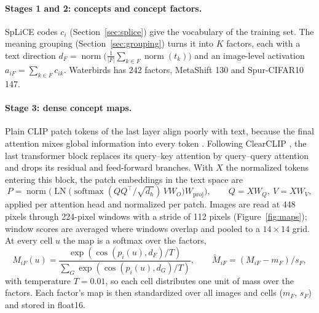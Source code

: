 \documentclass[11pt]{article}
\begin{document}
\paragraph{Stages 1 and 2: concepts and concept factors.} SpLiCE codes $c_i$ (Section~\ref{sec:splice}) give the
vocabulary of the training set. The meaning grouping (Section~\ref{sec:grouping}) turns it into $K$ factors, each
with a text direction $d_F=\operatorname{norm}\big(\tfrac{1}{|F|}\sum_{k\in F}\operatorname{norm}(t_k)\big)$ and an
image-level activation $a_{iF}=\sum_{k\in F}c_{ik}$. Waterbirds has 242 factors, MetaShift 130 and Spur-CIFAR10 147.

\paragraph{Stage 3: dense concept maps.} Plain CLIP patch tokens of the last layer align poorly with text, because the
final attention mixes global information into every token \citep{zhou2022maskclip}. Following ClearCLIP
\citep{lan2024clearclip}, the last transformer block replaces its query--key attention by query--query attention and
drops its residual and feed-forward branches. With $X$ the normalized tokens entering this block, the patch
embeddings in the text space are
\begin{equation}
P=\operatorname{norm}\Big(\operatorname{LN}\big(\operatorname{softmax}(QQ^\top/\sqrt{d_h})\,V W_O\big)W_{\text{proj}}\Big),\qquad Q=XW_Q,\ V=XW_V,
\end{equation}
applied per attention head and normalized per patch. Images are read at 448 pixels through 224-pixel windows with a
stride of 112 pixels (Figure~\ref{fig:maps}); window scores are averaged where windows overlap and pooled to a
$14\times14$ grid. At every cell $u$ the map is a softmax over the factors,
\begin{equation}
M_{iF}(u)=\frac{\exp(\cos(p_i(u),d_F)/T)}{\sum_G\exp(\cos(p_i(u),d_G)/T)},\qquad \tilde M_{iF}=(M_{iF}-m_F)/s_F,
\end{equation}
with temperature $T=0.01$, so each cell distributes one unit of mass over the factors. Each factor's map is then
standardized over all images and cells ($m_F$, $s_F$) and stored in float16.
\end{document}
